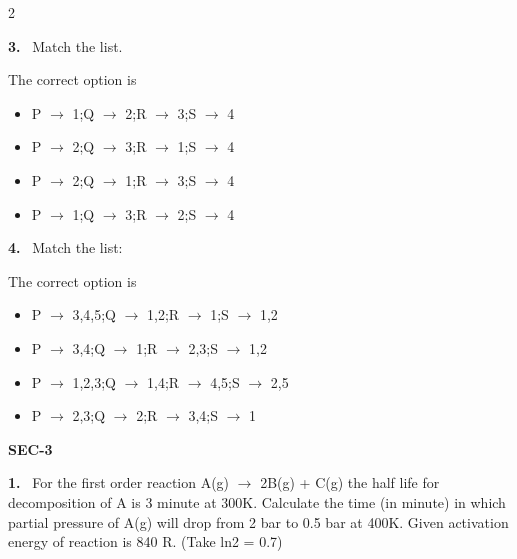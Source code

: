 \documentclass[10pt]{extarticle}
\newcommand{\sect}[1]{\par\smallskip\noindent\textbf{#1}\par}
\newcommand{\qn}[1]{\par\smallskip\noindent\textbf{#1.}~}
\newenvironment{qoptions}{\begin{itemize}[leftmargin=1.8em,itemsep=1pt,topsep=2pt,label={}]}{\end{itemize}}
\newcommand{\opt}[2]{\item[(#1)] #2}
\begin{document}
\begin{multicols}{2}
\qn{3} Match the list.\par
{}\par
The correct option is
\begin{qoptions}
\opt{A}{P $\to$ 1;Q $\to$ 2;R $\to$ 3;S $\to$ 4}
\opt{B}{P $\to$ 2;Q $\to$ 3;R $\to$ 1;S $\to$ 4}
\opt{C}{P $\to$ 2;Q $\to$ 1;R $\to$ 3;S $\to$ 4}
\opt{D}{P $\to$ 1;Q $\to$ 3;R $\to$ 2;S $\to$ 4}
\end{qoptions}
\qn{4} Match the list:\par
{}\par
The correct option is
\begin{qoptions}
\opt{A}{P $\to$ 3,4,5;Q $\to$ 1,2;R $\to$ 1;S $\to$ 1,2}
\opt{B}{P $\to$ 3,4;Q $\to$ 1;R $\to$ 2,3;S $\to$ 1,2}
\opt{C}{P $\to$ 1,2,3;Q $\to$ 1,4;R $\to$ 4,5;S $\to$ 2,5}
\opt{D}{P $\to$ 2,3;Q $\to$ 2;R $\to$ 3,4;S $\to$ 1}
\end{qoptions}
\sect{SEC-3}
\qn{1} For the first order reaction A(g) $\to$ 2B(g) + C(g) the half life for decomposition of A is 3 minute at 300K. Calculate the time (in minute) in which partial pressure of A(g) will drop from 2 bar to 0.5 bar at 400K. Given activation energy of reaction is 840 R. (Take ln2 = 0.7)

\end{multicols}
\end{document}
